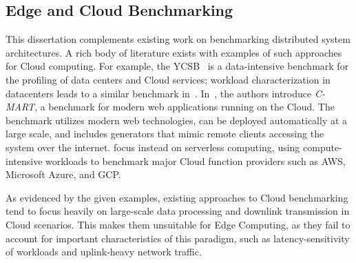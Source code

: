 \subsection{Edge and Cloud Benchmarking}

This dissertation complements existing work on benchmarking distributed system architectures.
A rich body of literature exists with examples of such approaches for Cloud computing.
For example, the \gls{YCSB}~\cite{cooper2010benchmarking} is a data-intensive benchmark for the profiling of data centers and Cloud services; workload characterization in datacenters leads to a similar benchmark in~\cite{jia2013characterizing}.
In~\cite{turner2012cmart}, the authors introduce \emph{C-MART}, a benchmark for modern web applications running on the Cloud.
The benchmark utilizes modern web technologies, can be deployed automatically at a large scale, and includes generators that mimic remote clients accessing the system over the internet.\@
\cite{malawski2018benchmarking,back2018using} focus instead on serverless computing, using compute-intensive workloads to benchmark major Cloud function providers such as \gls{AWS}, Microsoft Azure, and \gls{GCP}.

As evidenced by the given examples, existing approaches to Cloud benchmarking tend to focus heavily on large-scale data processing and downlink transmission in Cloud scenarios.
This makes them unsuitable for Edge Computing, as they fail to account for important characteristics of this paradigm, such as latency-sensitivity of workloads and uplink-heavy network traffic.

